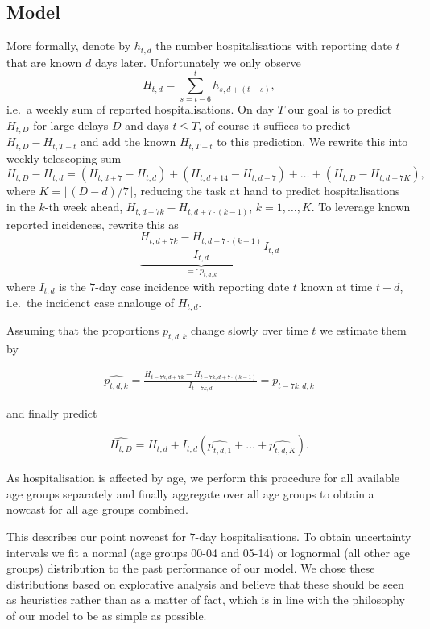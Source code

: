 \subsection{Model}
More formally, denote by \(h_{t,d}\) the number hospitalisations with
reporting date \(t\) that are known \(d\) days later. Unfortunately we
only observe \[H_{t,d} = \sum_{s = t - 6}^{t} h_{s,d + (t - s)},\]
i.e.~a weekly sum of reported hospitalisations. On day \(T\) our goal is
to predict \(H_{t,D}\) for large delays \(D\) and days \(t \leq T\), of
course it suffices to predict \(H_{t, D} - H_{t, T - t}\) and add the
known \(H_{t, T - t}\) to this prediction. We rewrite this into weekly
telescoping sum \[
H_{t,D} - H_{t,d} = \left(H_{t, d + 7} - H_{t,d}\right) + \left(H_{t, d + 14} - H_{t, d + 7}\right) + \dots + \left(H_{t,D} - H_{t, d + 7 K}\right),
\] where \(K = \lfloor (D -d) / 7 \rfloor\), reducing the task at hand
to predict hospitalisations in the \(k\)-th week ahead,
\(H_{t, d + 7k} - H_{t, d + 7\cdot(k - 1)}\), \(k = 1, \dots, K\). To
leverage known reported incidences, rewrite this as
\[\underbrace{\frac{H_{t, d + 7k} - H_{t, d + 7\cdot(k - 1)}}{I_{t,d}}}_{=:p_{t,d,k}} I_{t, d}\]
where \(I_{t,d}\) is the \(7\)-day case incidence with reporting date
\(t\) known at time \(t + d\), i.e.~the incidenct case analouge of
\(H_{t,d}\).

Assuming that the proportions \(p_{t,d,k}\) change slowly over time
\(t\) we estimate them by

\begin{align}
\label{eq:predict_p_tdk}
\widehat {p_{t,d,k}} = \frac{H_{t - 7k, d + 7k} - H_{t - 7k, d + 7\cdot(k - 1)}}{I_{t - 7k,d}} = p_{t - 7k,d,k}
\end{align}

and finally predict

\begin{align}
\label{eq:predict_H_tD}
\widehat{H_{t,D}} = H_{t,d} + I_{t,d} \left(\widehat{p_{t,d,1}} + \dots + \widehat{p_{t,d,K}}\right).
\end{align}

As hospitalisation is affected by age, we perform this procedure for all
available age groups separately and finally aggregate over all age
groups to obtain a nowcast for all age groups combined.

This describes our point nowcast for \(7\)-day hospitalisations. To
obtain uncertainty intervals we fit a normal (age groups 00-04 and
05-14) or lognormal (all other age groups) distribution to the past
performance of our model. We chose these distributions based on
explorative analysis and believe that these should be seen as heuristics
rather than as a matter of fact, which is in line with the philosophy of
our model to be as simple as possible.

